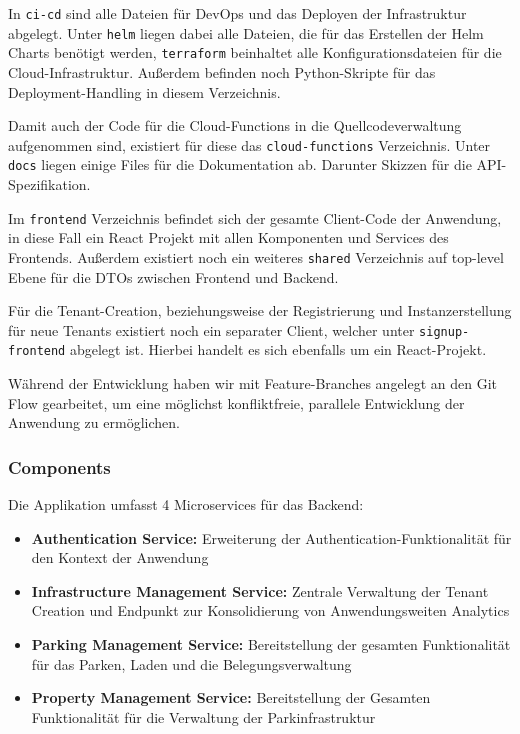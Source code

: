 In \verb|ci-cd| sind alle Dateien für DevOps und das Deployen der Infrastruktur abgelegt. Unter \verb|helm| liegen dabei alle Dateien, die für das Erstellen der Helm Charts benötigt werden, \verb|terraform| beinhaltet alle Konfigurationsdateien für die Cloud-Infrastruktur. Außerdem befinden noch Python-Skripte für das Deployment-Handling in diesem Verzeichnis.

Damit auch der Code für die Cloud-Functions in die Quellcodeverwaltung aufgenommen sind, existiert für diese das \verb|cloud-functions| Verzeichnis.
Unter \verb|docs| liegen einige Files für die Dokumentation ab. Darunter Skizzen für die API-Spezifikation.

Im \verb|frontend| Verzeichnis befindet sich der gesamte Client-Code der Anwendung, in diese Fall ein React Projekt mit allen Komponenten und Services des Frontends.
Außerdem existiert noch ein weiteres \verb|shared| Verzeichnis auf top-level Ebene für die DTOs zwischen Frontend und Backend.

Für die Tenant-Creation, beziehungsweise der Registrierung und Instanzerstellung für neue Tenants existiert noch ein separater Client, welcher unter \verb|signup-frontend| abgelegt ist. Hierbei handelt es sich ebenfalls um ein React-Projekt.

Während der Entwicklung haben wir mit Feature-Branches angelegt an den Git Flow gearbeitet, um eine möglichst konfliktfreie, parallele Entwicklung der Anwendung zu ermöglichen.

\subsubsection{Components}
Die Applikation umfasst 4 Microservices für das Backend:

\begin{itemize}
    \item \textbf{Authentication Service:} Erweiterung der Authentication-Funktionalität für den Kontext der Anwendung
    \item \textbf{Infrastructure Management Service:} Zentrale Verwaltung der Tenant Creation und Endpunkt zur Konsolidierung von Anwendungsweiten Analytics
    \item \textbf{Parking Management Service:} Bereitstellung der gesamten Funktionalität für das Parken, Laden und die Belegungsverwaltung
    \item \textbf{Property Management Service:} Bereitstellung der Gesamten Funktionalität für die Verwaltung der Parkinfrastruktur
\end{itemize}

